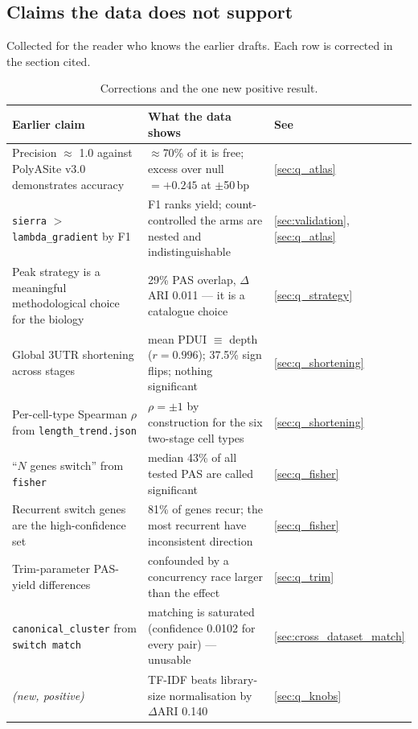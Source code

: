 \documentclass[11pt,a4paper]{article}
\begin{document}
\subsection{Claims the data does not support}
\label{sec:q_corrections}

Collected for the reader who knows the earlier drafts. Each row is corrected in
the section cited.

\begin{table}[htbp]
  \centering
  \small
  \begin{tabularx}{\textwidth}{XXl}
    \toprule
    \textbf{Earlier claim} & \textbf{What the data shows} & \textbf{See} \\
    \midrule
    Precision $\approx$ 1.0 against PolyASite v3.0 demonstrates accuracy &
    $\approx$70\% of it is free; excess over null $= +0.245$ at $\pm$50\,bp &
    \ref{sec:q_atlas} \\
    \texttt{sierra} $>$ \texttt{lambda\_gradient} by F1 &
    F1 ranks yield; count-controlled the arms are nested and indistinguishable &
    \ref{sec:validation}, \ref{sec:q_atlas} \\
    Peak strategy is a meaningful methodological choice for the biology &
    29\% PAS overlap, $\Delta$ARI 0.011 --- it is a catalogue choice &
    \ref{sec:q_strategy} \\
    Global 3\textquotesingle{}UTR shortening across stages &
    mean PDUI $\equiv$ depth ($r = 0.996$); 37.5\% sign flips; nothing significant &
    \ref{sec:q_shortening} \\
    Per-cell-type Spearman $\rho$ from \texttt{length\_trend.json} &
    $\rho = \pm1$ by construction for the six two-stage cell types &
    \ref{sec:q_shortening} \\
    ``$N$ genes switch'' from \texttt{fisher} &
    median 43\% of all tested PAS are called significant &
    \ref{sec:q_fisher} \\
    Recurrent switch genes are the high-confidence set &
    81\% of genes recur; the most recurrent have inconsistent direction &
    \ref{sec:q_fisher} \\
    Trim-parameter PAS-yield differences &
    confounded by a concurrency race larger than the effect &
    \ref{sec:q_trim} \\
    \texttt{canonical\_cluster} from \texttt{switch match} &
    matching is saturated (confidence 0.0102 for every pair) --- unusable &
    \ref{sec:cross_dataset_match} \\
    \midrule
    \emph{(new, positive)} &
    TF-IDF beats library-size normalisation by $\Delta$ARI 0.140 &
    \ref{sec:q_knobs} \\
    \bottomrule
  \end{tabularx}
  \caption{Corrections and the one new positive result.}
  \label{tab:corrections}
\end{table}
\end{document}
